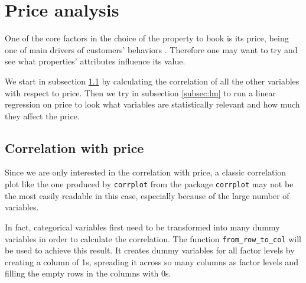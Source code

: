 \section{Price analysis}\label{Sec:Price analysis}

One of the core factors in the choice of the property to book is its price, being one of main drivers of customers' behaviors \citep{liang2018understanding}. Therefore one may want to try and see what properties' attributes influence its value.

We start in subsection \ref{subsec:corr} by calculating the correlation of all the other variables with respect to price. Then we try in subsection \ref{subsec:lm} to run a linear regression on price to look what variables are statistically relevant and how much they affect the price.


\subsection{Correlation with price}\label{subsec:corr}

Since we are only interested in the correlation with price, a classic correlation plot like the one produced by \texttt{corrplot} from the package \texttt{corrplot} may not be the most easily readable in this case, especially because of the large number of variables.

In fact, categorical variables first need to be transformed into many dummy variables in order to calculate the correlation. The function \texttt{from\_row\_to\_col} will be used to achieve this result. It creates dummy variables for all factor levels by creating a column of 1s, spreading it across so many columns as factor levels and filling the empty rows in the columns with 0s.




